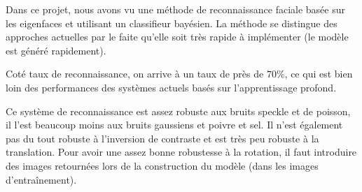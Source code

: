 Dans ce projet, nous avons vu une méthode de reconnaissance faciale
basée sur les eigenfaces et utilisant un classifieur bayésien. La 
méthode se distingue des approches actuelles par le faite qu'elle soit
très rapide à implémenter (le modèle est généré rapidement).

Coté taux de reconnaissance, on arrive à un taux de près de $70\%$, ce qui
est bien loin des performances des systèmes actuels basés sur l'apprentissage
profond.

Ce système de reconnaissance est assez robuste aux bruits speckle et de poisson,
il l'est beaucoup moins aux bruits gaussiens et poivre et sel. Il n'est également
pas du tout robuste à l'inversion de contraste et est très peu robuste à la translation.
Pour avoir une assez bonne robustesse à la rotation, il faut introduire des images
retournées lors de la construction du modèle (dans les images d’entraînement).